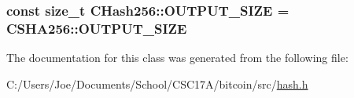 \subsubsection[{O\+U\+T\+P\+U\+T\+\_\+\+S\+I\+Z\+E}]{\setlength{\rightskip}{0pt plus 5cm}const size\+\_\+t C\+Hash256\+::\+O\+U\+T\+P\+U\+T\+\_\+\+S\+I\+Z\+E = C\+S\+H\+A256\+::\+O\+U\+T\+P\+U\+T\+\_\+\+S\+I\+Z\+E\hspace{0.3cm}{\ttfamily [static]}}\label{class_c_hash256_a6812a40441acb1c3b7f10c7e38c7d467}


The documentation for this class was generated from the following file\+:\begin{DoxyCompactItemize}
\item 
C\+:/\+Users/\+Joe/\+Documents/\+School/\+C\+S\+C17\+A/bitcoin/src/\hyperlink{hash_8h}{hash.\+h}\end{DoxyCompactItemize}
